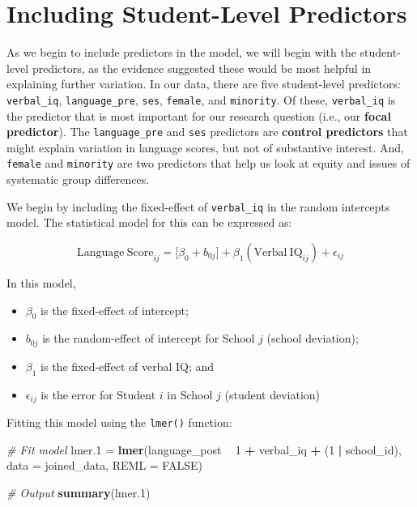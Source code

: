\documentclass[]{book}
\newenvironment{Shaded}{\begin{snugshade}}{\end{snugshade}}
\newcommand{\CommentTok}[1]{\textcolor[rgb]{0.56,0.35,0.01}{\textit{#1}}}
\newcommand{\DataTypeTok}[1]{\textcolor[rgb]{0.13,0.29,0.53}{#1}}
\newcommand{\DecValTok}[1]{\textcolor[rgb]{0.00,0.00,0.81}{#1}}
\newcommand{\FloatTok}[1]{\textcolor[rgb]{0.00,0.00,0.81}{#1}}
\newcommand{\KeywordTok}[1]{\textcolor[rgb]{0.13,0.29,0.53}{\textbf{#1}}}
\newcommand{\NormalTok}[1]{#1}
\newcommand{\OperatorTok}[1]{\textcolor[rgb]{0.81,0.36,0.00}{\textbf{#1}}}
\newcommand{\OtherTok}[1]{\textcolor[rgb]{0.56,0.35,0.01}{#1}}
\newcommand{\StringTok}[1]{\textcolor[rgb]{0.31,0.60,0.02}{#1}}
\providecommand{\tightlist}{%
  \setlength{\itemsep}{0pt}\setlength{\parskip}{0pt}}
\begin{document}
\hypertarget{including-student-level-predictors}{%
\section{Including Student-Level Predictors}\label{including-student-level-predictors}}

As we begin to include predictors in the model, we will begin with the student-level predictors, as the evidence suggested these would be most helpful in explaining further variation. In our data, there are five student-level predictors: \texttt{verbal\_iq}, \texttt{language\_pre}, \texttt{ses}, \texttt{female}, and \texttt{minority}. Of these, \texttt{verbal\_iq} is the predictor that is most important for our research question (i.e., our \textbf{focal predictor}). The \texttt{language\_pre} and \texttt{ses} predictors are \textbf{control predictors} that might explain variation in language scores, but not of substantive interest. And, \texttt{female} and \texttt{minority} are two predictors that help us look at equity and issues of systematic group differences.

We begin by including the fixed-effect of \texttt{verbal\_iq} in the random intercepts model. The statistical model for this can be expressed as:

\[
\mathrm{Language~Score}_{ij} = \big[\beta_0 + b_{0j}\big] + \beta_1(\mathrm{Verbal~IQ}_{ij}) + \epsilon_{ij}
\]

In this model,

\begin{itemize}
\tightlist
\item
  \(\beta_0\) is the fixed-effect of intercept;
\item
  \(b_{0j}\) is the random-effect of intercept for School \(j\) (school deviation);
\item
  \(\beta_1\) is the fixed-effect of verbal IQ; and
\item
  \(\epsilon_{ij}\) is the error for Student \(i\) in School \(j\) (student deviation)
\end{itemize}

Fitting this model using the \texttt{lmer()} function:

\begin{Shaded}
\begin{Highlighting}[]
\CommentTok{# Fit model}
\NormalTok{lmer}\FloatTok{.1}\NormalTok{ =}\StringTok{ }\KeywordTok{lmer}\NormalTok{(language_post }\OperatorTok{~}\StringTok{ }\DecValTok{1} \OperatorTok{+}\StringTok{ }\NormalTok{verbal_iq }\OperatorTok{+}\StringTok{ }\NormalTok{(}\DecValTok{1} \OperatorTok{|}\StringTok{ }\NormalTok{school_id), }\DataTypeTok{data =}\NormalTok{ joined_data, }\DataTypeTok{REML =} \OtherTok{FALSE}\NormalTok{)}

\CommentTok{# Output}
\KeywordTok{summary}\NormalTok{(lmer}\FloatTok{.1}\NormalTok{)}
\end{Highlighting}
\end{Shaded}
\end{document}
